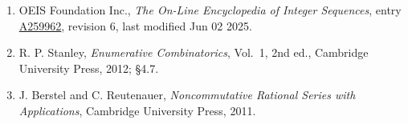 \documentclass[11pt]{article}
\theoremstyle{definition}
\begin{document}
\begin{enumerate}

\item OEIS Foundation Inc., \emph{The On-Line Encyclopedia of Integer Sequences}, entry \href{https://oeis.org/A259962}{A259962}, revision 6, last modified Jun 02 2025.

\item R. P. Stanley, \emph{Enumerative Combinatorics}, Vol.~1, 2nd ed., Cambridge University Press, 2012; \S4.7.

\item J. Berstel and C. Reutenauer, \emph{Noncommutative Rational Series with Applications}, Cambridge University Press, 2011.

\end{enumerate}
\end{document}
